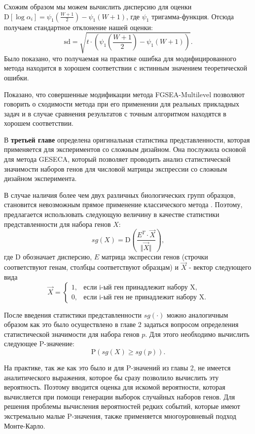 Схожим образом мы можем вычислить дисперсию для оценки $\mathrm{D} \left[\log \alpha_i \right]= \psi_1 \left(\frac{W + 1}{2}\right) - \psi_1 \left( W + 1 \right)$, где $\psi_1$ тригамма-функция. Отсюда получаем стандартное отклонение нашей оценки:
\[
    \mathrm{sd} = \sqrt{t \cdot \left( \psi_1 \left(\frac{W+1}{2}\right) - \psi_1 \left(W + 1\right)\right)}.    
\]
Было показано, что получаемая на практике ошибка для модифицированного метода находится в хорошем соответствии с истинным значением теоретической ошибки.  

Показано, что совершенные модификации метода FGSEA-Multilevel позволяют говорить о сходимости метода при его применении для реальных прикладных задач и в случае сравнения результатов с точным алгоритмом находятся в хорошем соответствии.


В \textbf{третьей главе} определена оригинальная статистика представленности, которая применяется для экспериментов со сложным дизайном.
Она послужила основой для метода GESECA, который позволяет проводить анализ статистической значимости наборов генов для числовой матрицы экспрессии со сложным дизайном эксперимента.

В случае наличия более чем двух различных биологических групп образцов, становится невозможным прямое применение классического метода \cite{subramanian2005gene}.
Поэтому, предлагается использовать следующую величину в качестве статистики представленности для набора генов $X$:
\[
       sg(X) = \mathrm{D} \left(\frac{E^T \cdot \overrightarrow{X}}{\Vert \overrightarrow{X} \Vert}\right),
\]
где $\mathrm{D}$ обозначает дисперсию, $E$ матрица экспрессии генов (строчки соответствуют генам, столбцы соответствуют образцам) и $\overrightarrow{X}$ - вектор следующего вида
\[
    \overrightarrow{X} = \begin{cases}
        1, & \text{если i-ый ген принадлежит набору X}, \\
        0, & \text{если i-ый ген не принадлежит набору X}.
    \end{cases}
\]

После введения статистики представленности $sg(\cdot)$ можно аналогичным образом как это было осуществлено в главе 2 задаться вопросом определения статистической значимости для набора генов $p$.
Для этого необходимо вычислить следующее P-значение:
\[
    \mathrm{P} \left( sg(X) \geqslant sg(p) \right). 
\] 

На практике, так же как это было и для P-значений из главы 2, не имеется аналитического выражения, которое бы сразу позволило вычислить эту вероятность.
Поэтому вводится оценка для искомой вероятности, которая вычисляется при помощи генерации выборок случайных наборов генов.
Для решения проблемы вычисления вероятностей редких событий, которые имеют экстремально малые P-значения, также применяется многоуровневый подход Монте-Карло.

